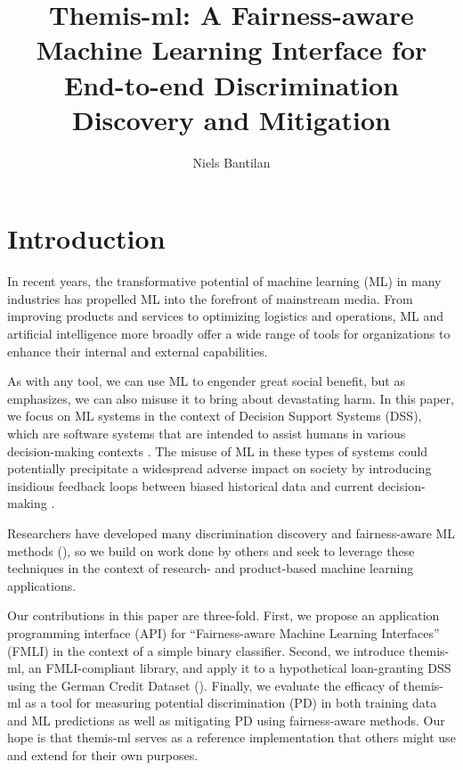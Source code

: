 \documentclass[man,natbib]{apa6}
\title{
  Themis-ml: A Fairness-aware Machine Learning Interface for \\
  End-to-end Discrimination Discovery and Mitigation
}
\author{Niels Bantilan}
\affiliation{Arena.io}
\affiliation{New York, NY}
\begin{document}
\maketitle
\section{Introduction} In recent years, the transformative potential of machine
learning (ML) in many industries has propelled ML into the forefront of
mainstream media. From improving products and services to optimizing logistics
and operations, ML and artificial intelligence more broadly offer a wide range
of tools for organizations to enhance their internal and external capabilities.

As with any tool, we can use ML to engender great social benefit, but as
\citet{o2017weapons} emphasizes, we can also misuse it to bring about devastating
harm. In this paper, we focus on ML systems in the context of Decision Support
Systems (DSS), which are software systems that are intended to assist humans in
various decision-making contexts \cite{yoshimura2006decision,
montgomery2000evaluation, barnett1987dxplain, mysiak2005towards}. The misuse of
ML in these types of systems could potentially precipitate a widespread adverse
impact on society by introducing insidious feedback loops between biased
historical data and current decision-making \cite{o2017weapons}.

Researchers have developed many discrimination discovery and fairness-aware ML
methods (\citealp{kusner2017counterfactual, kamiran2012data, kamishima2012fairness,
kamiran2012decision, zemel2013learning, zafar2017fairness,
Dwork:2012:FTA:2090236.2090255, zliobaite2015survey}), so we build on work done
by others and seek to leverage these techniques in the context of research- and
product-based machine learning applications.

Our contributions in this paper are three-fold. First, we propose an application
programming interface (API) for ``Fairness-aware Machine Learning Interfaces''
(FMLI) in the context of a simple binary classifier. Second, we introduce
themis-ml, an FMLI-compliant library, and apply it to a hypothetical
loan-granting DSS using the German Credit Dataset (\citealp{Lichman:2013}). Finally, we
evaluate the efficacy of themis-ml as a tool for measuring potential
discrimination (PD) in both training data and ML predictions as well as
mitigating PD using fairness-aware methods. Our hope is that themis-ml serves as
a reference implementation that others might use and extend for their own
purposes.
\end{document}
